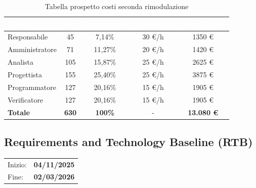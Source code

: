\documentclass[a4paper, 11pt]{article}
\begin{document}
\begin{table}[H]
  \centering
  \begin{tabular}{|l|c|c|c|c|}
    \hline
    \cellcolor{AccentColor}\textbf{\textcolor{white}{Ruolo}} & 
    \cellcolor{AccentColor}\textbf{\textcolor{white}{Ore}} & 
    \cellcolor{AccentColor}\textbf{\textcolor{white}{Percentuale}} & 
    \cellcolor{AccentColor}\textbf{\textcolor{white}{Costo(€/h)}} & 
    \cellcolor{AccentColor}\textbf{\textcolor{white}{Costo Totale}} \\
    \hline
    
    Responsabile & 45 & 7,14\% & 30 €/h & 1350 € \\ \hline
    Amministratore & 71 & 11,27\% & 20 €/h & 1420 € \\ \hline
    Analista & 105 & 15,87\% & 25 €/h & 2625 € \\ \hline
    Progettista & 155 & 25,40\% & 25 €/h & 3875 € \\ \hline
    Programmatore & 127 & 20,16\% & 15 €/h & 1905 € \\ \hline
    Verificatore & 127 & 20,16\% & 15 €/h & 1905 € \\ \hline
    \textbf{Totale} & \textbf{630} & \textbf{100\%} & - & \textbf{13.080 €} \\ \hline
  \end{tabular}
  \caption{Tabella prospetto costi seconda rimodulazione}
\end{table}


\subsection{Requirements and Technology Baseline (RTB)}
\vspace{0.4cm}
\begin{tabular}{ll}
Inizio: & \textbf{04/11/2025} \\
Fine: & \textbf{02/03/2026} \\
\end{tabular}
\vspace{0.2cm}
\end{document}
